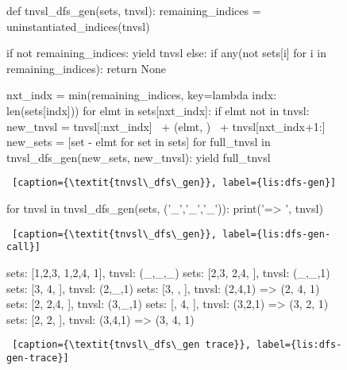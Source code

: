 \begin{figure}[htb]
    \centering
\begin{minipage}[c]{0.45\textwidth}
\begin{python1}  
def tnvsl_dfs_gen(sets, tnvsl):
  remaining_indices = uninstantiated_indices(tnvsl)

  if not remaining_indices: yield tnvsl
  else:
    if any(not sets[i] for i in remaining_indices):
      return None
      
    nxt_indx = min(remaining_indices,
                   key=lambda indx: len(sets[indx]))
    for elmt in sets[nxt_indx]:
      if elmt not in tnvsl:
        new_tnvsl = tnvsl[:nxt_indx] \
                    + (elmt, ) \
                    + tnvsl[nxt_indx+1:]
        new_sets = [set - {elmt} for set in sets]
        for full_tnvsl in tnvsl_dfs_gen(new_sets, 
                                        new_tnvsl):
          yield full_tnvsl
\end{python1}\linv
\begin{lstlisting} [caption={\textit{tnvsl\_dfs\_gen}}, label={lis:dfs-gen}]
\end{lstlisting}
\end{minipage}\linv
\end{figure}


\begin{figure}[htb]
    \centering
\begin{minipage}[c]{0.45\textwidth}
\begin{python1}  
for tnvsl in tnvsl_dfs_gen(sets, ('_','_','_')):
    print('=> ', tnvsl)
\end{python1}\linv
\begin{lstlisting} [caption={\textit{tnvsl\_dfs\_gen}}, label={lis:dfs-gen-call}]
\end{lstlisting}
\end{minipage}\linv
\end{figure}


\begin{figure}[!ht]
    \centering
\begin{minipage}[c]{0.45\textwidth}
\begin{python1}  
sets: [{1,2,3}, {1,2,4}, {1}], tnvsl: (_,_,_)
  sets: [{2,3}, {2,4}, {}], tnvsl: (_,_,1)
    sets: [{3}, {4}, {}], tnvsl: (2,_,1)
      sets: [{3}, {}, {}], tnvsl: (2,4,1)
=>  (2, 4, 1)
    sets: [{2}, {2,4}, {}], tnvsl: (3,_,1)
      sets: [{}, {4}, {}], tnvsl: (3,2,1)
=>  (3, 2, 1)
      sets: [{2}, {2}, {}], tnvsl: (3,4,1)
=>  (3, 4, 1)
\end{python1}\linv
\begin{lstlisting} [caption={\textit{tnvsl\_dfs\_gen trace}}, label={lis:dfs-gen-trace}]
\end{lstlisting}\inv
\end{minipage}\linv
\end{figure}

